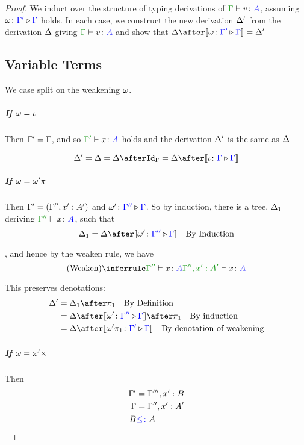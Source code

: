 \documentclass{report}
\begin{document}
\begin{framed}
    
    \begin{proof}
        
        We induct over the structure of typing derivations of $\gtyperelation{v}{A}$, assuming $\omega \colon {\color{blue}\Gamma'} \triangleright {\color {blue} \Gamma}$ holds. In each case, we construct the new derivation $\Delta'$ from the derivation $\Delta$ giving $\gtyperelation{v}{A}$ and show that $\D\after\deno{\wrel{\w}{\G'}{\G}} = \D'$
        
        \subsection{Variable Terms}
        \case{\vvar, \vweaken}
            We case split on the weakening $\omega$.
            \subparagraph{If $\omega = \iota$}
            Then $\Gamma' = \Gamma$, and so $\typerelation{\G'}{x}{A}$ holds and the derivation $\Delta'$ is the same as $\Delta$
        
            \begin{equation}
                \D' = \D = \D\after\idg = \D\after\deno{\wrel{\i}{\G}{\G}} 
            \end{equation}
            \subparagraph{If $\omega = \omega'\pi$}
            Then  $\Gamma' = (\Gamma'',x': A')$ and $\omega' \colon {\color{blue}\Gamma''} \triangleright {\color {blue} \Gamma}$. So by induction, there is a tree, $\Delta_1$ deriving $\typerelation{\G''}{x}{A}$,  such that 
            \begin{equation}
                \D_1 = \D\after\deno{\wrel{\w'}{\G''}{\G}} \qt{By Induction}
            \end{equation}
            
            , and hence by the weaken rule, we have 
            \begin{equation}
                \ntreeruleI{\vweaken}{\typerelation{\G''}{x}{A}}{\typerelation{\G'', x':A' }{x}{A}}
            \end{equation}
        
            This preserves denotations:
            \begin{align*}
                \D' & = \D_1\after\p\qt{By Definition} \\
                & = \D\after\deno{\wrel{\w'}{\G''}{\G}}\after\p\qt{By induction}\\
                & = \D\after\deno{\wrel{\w'\p}{\G'}{\G}}\qt{By denotation of weakening}
            \end{align*}
        
            \subparagraph{If $\omega = \omega'\times$} 
            Then 
            \begin{align*}
                \Gamma' & = \Gamma''', x': B\\
                \Gamma &= \Gamma'', x': A'\\
                B & {\color{blue} \leq\colon} A
            \end{align*}
        

\end{proof}
\end{framed}
\end{document}
